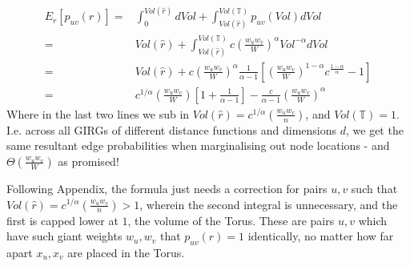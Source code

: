 \begin{align}
    E_r[p_{uv}(r)] =& 
    \int_0^{Vol(\hat{r})} dVol + 
    \int_{Vol(\hat{r})}^{Vol(\mathbb{T})} p_{uv}(Vol) dVol
    \\
    =&
    Vol(\hat{r}) + 
    \int_{Vol(\hat{r})}^{Vol(\mathbb{T})} 
    c \left (\frac{w_u w_v}{W} \right )^\alpha Vol^{-\alpha}  
        dVol
    \\
    =&
    Vol(\hat{r}) + 
    c \left (\frac{w_u w_v}{W} \right )^\alpha \frac{1}{\alpha - 1}
        \left [
            \left (\frac{w_u w_v}{W} \right )^{1 - \alpha} c^{\frac{1 - \alpha}{\alpha}} - 1
        \right ]
    \\
    =&
    c^{1/\alpha} \left (\frac{w_u w_v}{W} \right ) 
        \left [ 1 + \frac{1}{\alpha - 1} \right ] 
    - 
    \frac{c}{\alpha - 1} \left (\frac{w_u w_v}{W} \right )^\alpha
    \label{eq:p_u_to_v_marginal_on_position}
\end{align}
Where in the last two lines we sub in $Vol(\hat{r}) = c^{1/\alpha} \left (\frac{w_u w_v}{n} \right )$, and $Vol(\mathbb{T}) = 1$.
I.e. across all GIRGs of different distance functions and dimensions $d$, we get the same resultant edge probabilities when marginalising out node locations - and $\Theta(\frac{w_u w_v}{W})$ as promised!

Following \cite{blasius2022efficiently} Appendix, the formula just needs a correction for pairs $u, v$ such that $Vol(\hat{r}) = c^{1/\alpha} \left ( \frac{w_u w_v}{n} \right ) > 1$, wherein the second integral is unnecessary, and the first is capped lower at $1$, the volume of the Torus. These are pairs $u, v$ which have such giant weights $w_u, w_v$ that $p_{uv}(r) = 1$ identically, no matter how far apart $x_u, x_v$ are placed in the Torus.







